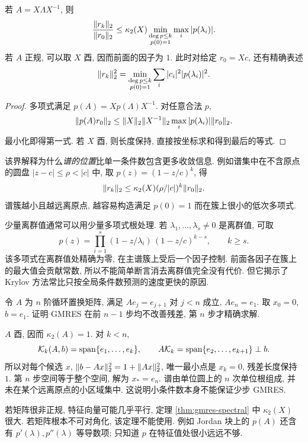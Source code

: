 \begin{theorem}[可对角化情形的谱界]\label{thm:gmres-spectral}
若 $A=X\Lambda X^{-1}$, 则
\begin{equation}\label{eq:gmres-spectral-bound}
\frac{\lVert r_k\rVert_2}{\lVert r_0\rVert_2}
\le\kappa_2(X)
\min_{\substack{\deg p\le k\\p(0)=1}}
\max_i|p(\lambda_i)|.
\end{equation}
若 $A$ 正规, 可以取 $X$ 酉, 因而前面的因子为 $1$. 此时对给定 $r_0=Xc$, 还有精确表述
\[
\lVert r_k\rVert_2^2=
\min_{\substack{\deg p\le k\\p(0)=1}}
\sum_i|c_i|^2|p(\lambda_i)|^2.
\]
\end{theorem}
\begin{proof}
多项式满足 $p(A)=Xp(\Lambda)X^{-1}$. 对任意合法 $p$,
\[
\lVert p(A)r_0\rVert_2\le\lVert X\rVert_2\lVert X^{-1}\rVert_2
\max_i|p(\lambda_i)|\lVert r_0\rVert_2.
\]
最小化即得第一式. 若 $X$ 酉, 则长度保持, 直接按坐标求和得到最后的等式.
\end{proof}
该界解释为什么\emph{谱的位置}比单一条件数包含更多收敛信息. 例如谱集中在不含原点的圆盘 $|z-c|\le\rho<|c|$ 中, 取
$p(z)=(1-z/c)^k$, 得
\[
\lVert r_k\rVert_2\le\kappa_2(X)(\rho/|c|)^k\lVert r_0\rVert_2.
\]
谱簇越小且越远离原点, 越容易构造满足 $p(0)=1$ 而在簇上很小的低次多项式.

少量离群值通常可以用少量多项式根处理. 若 $\lambda_1,\ldots,\lambda_s\ne0$ 是离群值, 可取
\[
p(z)=\prod_{i=1}^s(1-z/\lambda_i)\,(1-z/c)^{k-s},\qquad k\ge s.
\]
该多项式在离群值处精确为零, 在主谱簇上受后一个因子控制. 前面各因子在簇上的最大值会贡献常数, 所以不能简单断言消去离群值完全没有代价. 但它揭示了 Krylov 方法常比只按全局条件数预测的速度更快的原因.

\begin{example}\label{ex:gmres-cycle}
令 $A$ 为 $n$ 阶循环置换矩阵, 满足 $Ae_j=e_{j+1}$ 对 $j<n$ 成立, $Ae_n=e_1$. 取 $x_0=0$, $b=e_1$. 证明 GMRES 在前 $n-1$ 步均不改善残差, 第 $n$ 步才精确求解.
\end{example}
\begin{solution}
$A$ 酉, 因而 $\kappa_2(A)=1$. 对 $k<n$,
\[
\mathcal K_k(A,b)=\operatorname{span}\{e_1,\ldots,e_k\},\qquad
A\mathcal K_k=\operatorname{span}\{e_2,\ldots,e_{k+1}\}\perp b.
\]
所以对每个候选 $x$, $\lVert b-Ax\rVert_2^2=1+\lVert Ax\rVert_2^2$, 唯一最小点是 $x_k=0$, 残差长度保持 $1$. 第 $n$ 步空间等于整个空间, 解为 $x_*=e_n$. 谱由单位圆上的 $n$ 次单位根组成, 并未在某个远离原点的小区域集中. 这说明小条件数本身不能保证少步 GMRES.
\end{solution}

若矩阵很非正规, 特征向量可能几乎平行, 定理 \ref{thm:gmres-spectral} 中 $\kappa_2(X)$ 很大. 若矩阵根本不可对角化, 该定理不能使用. 例如 Jordan 块上的 $p(A)$ 还含有 $p'(\lambda),p''(\lambda)$ 等导数项; 只知道 $p$ 在特征值处很小远远不够.

